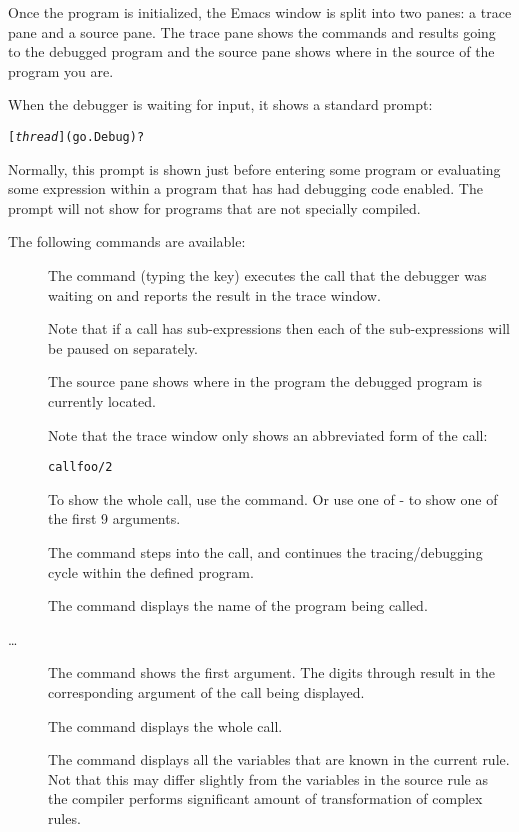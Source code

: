 Once the program is initialized, the Emacs window is split into two panes: a trace pane and a source pane. The trace pane shows the commands and results going to the debugged program and the source pane shows where in the source of the program you are.

When the debugger is waiting for input, it shows a standard prompt:
\begin{alltt}
[\emph{thread}] (go.Debug) ?
\end{alltt}
Normally, this prompt is shown just before entering some program or evaluating some expression within a program that has had debugging code enabled. The prompt will not show for programs that are not specially compiled.

The following commands are available:
\begin{description}
\item[]
The  command (typing the  key) executes the call that the debugger was waiting on and reports the result in the trace window.

Note that if a call has sub-expressions then each of the sub-expressions will be paused on separately.

The source pane shows where in the program the debugged program is currently located.

Note that the trace window only shows an abbreviated form of the call:
\begin{alltt}
call foo/2
\end{alltt}
To show the whole call, use the  command. Or use one of  -  to show one of the first 9 arguments.

\item[]
The  command steps into the call, and continues the tracing/debugging cycle within the defined program.

\item[]
The  command displays the name of the program being called.

\item[ \ldots {}]
The  command shows the first argument. The digits  through  result in the corresponding argument of the call being displayed.

\item[]
The  command displays the whole call.

\item[]
The  command displays all the variables that are known in the current rule. Not that this may differ slightly from the variables in the source rule as the compiler performs  significant amount of transformation of complex \go rules.


\end{description}
